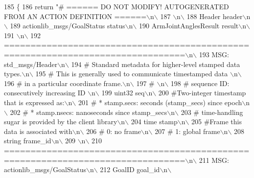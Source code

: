 \begin{DoxyCode}
185   \{
186     \textcolor{keywordflow}{return} \textcolor{stringliteral}{"# ====== DO NOT MODIFY! AUTOGENERATED FROM AN ACTION DEFINITION ======\(\backslash\)n\(\backslash\)}
187 \textcolor{stringliteral}{\(\backslash\)n\(\backslash\)}
188 \textcolor{stringliteral}{Header header\(\backslash\)n\(\backslash\)}
189 \textcolor{stringliteral}{actionlib\_msgs/GoalStatus status\(\backslash\)n\(\backslash\)}
190 \textcolor{stringliteral}{ArmJointAnglesResult result\(\backslash\)n\(\backslash\)}
191 \textcolor{stringliteral}{\(\backslash\)n\(\backslash\)}
192 \textcolor{stringliteral}{================================================================================\(\backslash\)n\(\backslash\)}
193 \textcolor{stringliteral}{MSG: std\_msgs/Header\(\backslash\)n\(\backslash\)}
194 \textcolor{stringliteral}{# Standard metadata for higher-level stamped data types.\(\backslash\)n\(\backslash\)}
195 \textcolor{stringliteral}{# This is generally used to communicate timestamped data \(\backslash\)n\(\backslash\)}
196 \textcolor{stringliteral}{# in a particular coordinate frame.\(\backslash\)n\(\backslash\)}
197 \textcolor{stringliteral}{# \(\backslash\)n\(\backslash\)}
198 \textcolor{stringliteral}{# sequence ID: consecutively increasing ID \(\backslash\)n\(\backslash\)}
199 \textcolor{stringliteral}{uint32 seq\(\backslash\)n\(\backslash\)}
200 \textcolor{stringliteral}{#Two-integer timestamp that is expressed as:\(\backslash\)n\(\backslash\)}
201 \textcolor{stringliteral}{# * stamp.secs: seconds (stamp\_secs) since epoch\(\backslash\)n\(\backslash\)}
202 \textcolor{stringliteral}{# * stamp.nsecs: nanoseconds since stamp\_secs\(\backslash\)n\(\backslash\)}
203 \textcolor{stringliteral}{# time-handling sugar is provided by the client library\(\backslash\)n\(\backslash\)}
204 \textcolor{stringliteral}{time stamp\(\backslash\)n\(\backslash\)}
205 \textcolor{stringliteral}{#Frame this data is associated with\(\backslash\)n\(\backslash\)}
206 \textcolor{stringliteral}{# 0: no frame\(\backslash\)n\(\backslash\)}
207 \textcolor{stringliteral}{# 1: global frame\(\backslash\)n\(\backslash\)}
208 \textcolor{stringliteral}{string frame\_id\(\backslash\)n\(\backslash\)}
209 \textcolor{stringliteral}{\(\backslash\)n\(\backslash\)}
210 \textcolor{stringliteral}{================================================================================\(\backslash\)n\(\backslash\)}
211 \textcolor{stringliteral}{MSG: actionlib\_msgs/GoalStatus\(\backslash\)n\(\backslash\)}
212 \textcolor{stringliteral}{GoalID goal\_id\(\backslash\)n\(\backslash\)}

\end{DoxyCode}
